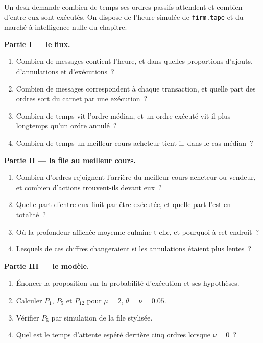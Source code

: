 \begin{problem}\label{pb:mx:the-limit-order-book:1}
Un desk demande combien de temps ses ordres passifs attendent et combien d'entre eux sont exécutés. On dispose de l'heure simulée de \texttt{firm.tape} et du marché
à intelligence nulle du chapitre.

\medskip\noindent\textbf{Partie I --- le flux.}
\begin{enumerate}
\item Combien de messages contient l'heure, et dans quelles proportions d'ajouts, d'annulations et d'exécutions~?
\item Combien de messages correspondent à chaque transaction, et quelle part des ordres sort du carnet par une exécution~?
\item Combien de temps vit l'ordre médian, et un ordre exécuté vit-il plus longtemps qu'un ordre annulé~?
\item Combien de temps un meilleur cours acheteur tient-il, dans le cas médian~?
\end{enumerate}

\medskip\noindent\textbf{Partie II --- la file au meilleur cours.}
\begin{enumerate}[resume]
\item Combien d'ordres rejoignent l'arrière du meilleur cours acheteur ou vendeur, et combien d'actions trouvent-ils devant eux~?
\item Quelle part d'entre eux finit par être exécutée, et quelle part l'est en totalité~?
\item Où la profondeur affichée moyenne culmine-t-elle, et pourquoi à cet endroit~?
\item Lesquels de ces chiffres changeraient si les annulations étaient plus lentes~?
\end{enumerate}

\medskip\noindent\textbf{Partie III --- le modèle.}
\begin{enumerate}[resume]
\item Énoncer la proposition sur la probabilité d'exécution et ses hypothèses.
\item Calculer $P_1$, $P_5$ et $P_{12}$ pour $\mu=2$, $\theta=\nu=0.05$.
\item Vérifier $P_5$ par simulation de la file stylisée.
\item Quel est le temps d'attente espéré derrière cinq ordres lorsque $\nu=0$~?
\end{enumerate}


\end{problem}
